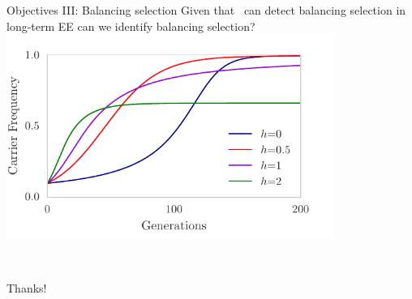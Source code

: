 \documentclass[t]{beamer} %
\begin{document}
\begin{frame}{Objectives III: Balancing selection}
	Given that \comale\ can detect balancing selection in long-term EE can we 
	identify balancing selection?
	\includegraphics[width=0.8\textwidth]{../figures/dominance.pdf}
\end{frame}

\begin{frame}{\ }
	\vspace{1	in}
	\begin{center}
		\huge{Thanks!}\\
	\end{center}
	
\end{frame}
\end{document}

